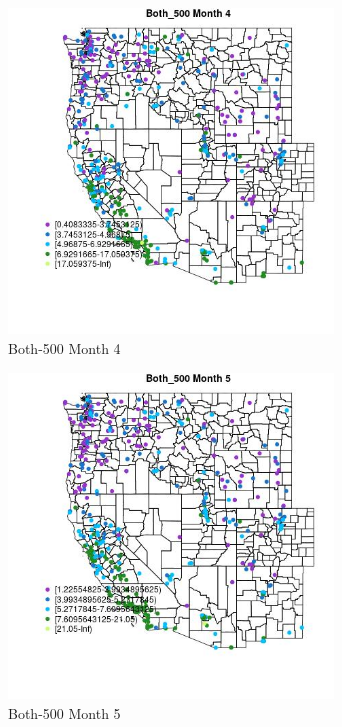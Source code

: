 \begin{figure} 
\centering  
\includegraphics[width=0.77\textwidth]{Code_Outputs/ML_input_report_ML_input_PM25_Step5_part_d_de_duplicated_aves_ML_input_MapObsMo4Both_500.jpg} 
\caption{\label{fig:ML_input_report_ML_input_PM25_Step5_part_d_de_duplicated_aves_ML_inputMapObsMo4Both_500}Both-500 Month 4} 
\end{figure} 
 

\begin{figure} 
\centering  
\includegraphics[width=0.77\textwidth]{Code_Outputs/ML_input_report_ML_input_PM25_Step5_part_d_de_duplicated_aves_ML_input_MapObsMo5Both_500.jpg} 
\caption{\label{fig:ML_input_report_ML_input_PM25_Step5_part_d_de_duplicated_aves_ML_inputMapObsMo5Both_500}Both-500 Month 5} 
\end{figure} 
 

